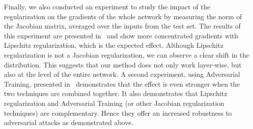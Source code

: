 Finally, we also conducted an experiment to study the impact of the regularization on the gradients of the whole network by measuring the norm of the Jacobian matrix, averaged over the inputs from the test set.
The results of this experiment are presented in~ and show more concentrated gradients with  Lipschitz regularization, which is the expected effect.
Although Lipschitz regularization is not a Jacobian regularization, we can observe a clear shift in the distribution.
This suggests that our method does not only work layer-wise, but also at the level of the entire network.
A second experiment, using Adversarial Training, presented in~ demonstrates that the effect is even stronger when the two techniques are combined together.
It also demonstrates that Lipschitz regularization and Adversarial Training (or other Jacobian regularization techniques) are complementary.
Hence they offer an increased robustness to adversarial attacks as demonstrated above.


